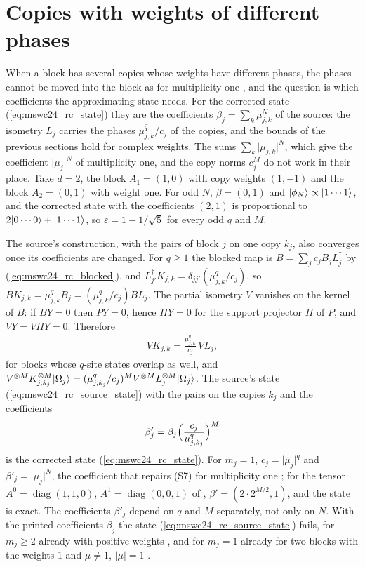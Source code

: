 \documentclass{article}
\begin{document}
\section{Copies with weights of different phases}\label{sec:mswc24_rc_phases}
When a block has several copies whose weights have different phases, the phases cannot be
moved into the block as for multiplicity one \cite{gap:mswc24_block_form_mixed_overlap}, and
the question is which coefficients the approximating state needs. For the corrected state
(\ref{eq:mswc24_rc_state}) they are the coefficients $\beta_j=\sum_k\mu_{j,k}^N$ of the
source: the isometry $L_j$ carries the phases $\overline{\mu_{j,k}^q}/c_j$ of the copies, and
the bounds of the previous sections hold for complex weights. The sums
$\sum_k\lvert\mu_{j,k}\rvert^N$, which give the coefficient $\lvert\mu_j\rvert^N$ of
multiplicity one, and the copy norms $c_j^M$ do not work in their place. Take $d=2$, the
block $A_1=(1,0)$ with copy weights $(1,-1)$ and the block $A_2=(0,1)$ with weight one. For
odd $N$, $\beta=(0,1)$ and $|\phi_N\rangle\propto|1\cdots1\rangle$, and the corrected state with
the coefficients $(2,1)$ is proportional to $2|0\cdots0\rangle+|1\cdots1\rangle$, so
$\varepsilon=1-1/\sqrt5$ for every odd $q$ and $M$.

The source's construction, with the pairs of block $j$ on one copy $k_j$, also converges once
its coefficients are changed. For $q\geq1$ the blocked map is $B=\sum_jc_jB_jL_j^\dagger$
by (\ref{eq:mswc24_rc_blocked}), and $L_{j'}^\dagger K_{j,k}=\delta_{jj'}(\mu_{j,k}^q/c_j)$,
so $BK_{j,k}=\mu_{j,k}^qB_j=(\mu_{j,k}^q/c_j)BL_j$. The partial isometry $V$ vanishes on the
kernel of $B$: if $BY=0$ then $PY=0$, hence $\Pi Y=0$ for the support projector $\Pi$ of
$P$, and $VY=V\Pi Y=0$. Therefore
\begin{align}
    VK_{j,k}=\frac{\mu_{j,k}^q}{c_j}\,VL_j,
    \label{eq:mswc24_rc_one_copy}
\end{align}
for blocks whose $q$-site states overlap as well, and
$V^{\otimes M}K_{j,k_j}^{\otimes M}|\Omega_j\rangle=(\mu_{j,k_j}^q/c_j)^MV^{\otimes M}
    L_j^{\otimes M}|\Omega_j\rangle$. The source's state (\ref{eq:mswc24_rc_source_state}) with
the pairs on the copies $k_j$ and the coefficients
\begin{align}
    \beta'_j=\beta_j\Bigl(\frac{c_j}{\mu_{j,k_j}^q}\Bigr)^M
    \label{eq:mswc24_rc_one_copy_weight}
\end{align}
is the corrected state (\ref{eq:mswc24_rc_state}). For $m_j=1$, $c_j=\lvert\mu_j\rvert^q$ and
$\beta'_j=\lvert\mu_j\rvert^N$, the coefficient that repairs (S7) for multiplicity one
\cite{gap:mswc24_block_form_mixed_overlap}; for the tensor $A^0=\operatorname{diag}(1,1,0)$,
$A^1=\operatorname{diag}(0,0,1)$ of \cite{gap:mswc24_multiplicity_fixed_point},
$\beta'=(2\cdot2^{M/2},1)$, and the state is exact. The coefficients $\beta'_j$ depend on $q$
and $M$ separately, not only on $N$. With the printed coefficients $\beta_j$ the state
(\ref{eq:mswc24_rc_source_state}) fails, for $m_j\geq2$ already with positive weights
\cite{gap:mswc24_multiplicity_fixed_point}, and for $m_j=1$ already for two blocks with the
weights $1$ and $\mu\neq1$, $\lvert\mu\rvert=1$ \cite{gap:mswc24_block_form_mixed_overlap}.
\end{document}
